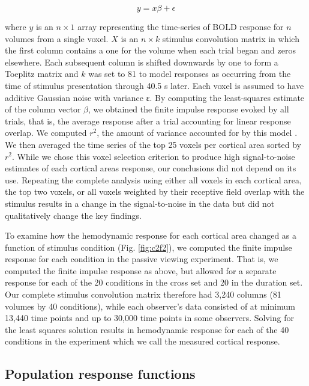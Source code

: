 \begin{equation}
    y=x\beta+\epsilon
\end{equation}

where $y$ is an $n\times 1$ array representing the time-series of BOLD response for $n$ volumes from a single voxel. $X$ is an $n\times k$ stimulus convolution matrix in which the first column contains a one for the volume when each trial began and zeros elsewhere. Each subsequent column is shifted downwards by one to form a Toeplitz matrix and $k$ was set to 81 to model responses as occurring from the time of stimulus presentation through 40.5 s later. Each voxel is assumed to have additive Gaussian noise with variance ε. By computing the least-squares estimate of the column vector $\beta$, we obtained the finite impulse response evoked by all trials, that is, the average response after a trial accounting for linear response overlap. We computed $r^2$, the amount of variance accounted for by this model \citep{Gardner2005-pg}. We then averaged the time series of the top 25 voxels per cortical area sorted by $r^2$. While we chose this voxel selection criterion to produce high signal-to-noise estimates of each cortical areas response, our conclusions did not depend on its use. Repeating the complete analysis using either all voxels in each cortical area, the top two voxels, or all voxels weighted by their receptive field overlap with the stimulus results in a change in the signal-to-noise in the data but did not qualitatively change the key findings.

To examine how the hemodynamic response for each cortical area changed as a function of stimulus condition (Fig. \ref{fig:c2f2}), we computed the finite impulse response for each condition in the passive viewing experiment. That is, we computed the finite impulse response as above, but allowed for a separate response for each of the 20 conditions in the cross set and 20 in the duration set. Our complete stimulus convolution matrix therefore had 3,240 columns (81 volumes by 40 conditions), while each observer’s data consisted of at minimum 13,440 time points and up to 30,000 time points in some observers. Solving for the least squares solution results in hemodynamic response for each of the 40 conditions in the experiment which we call the measured cortical response.

\subsection{Population response functions}

